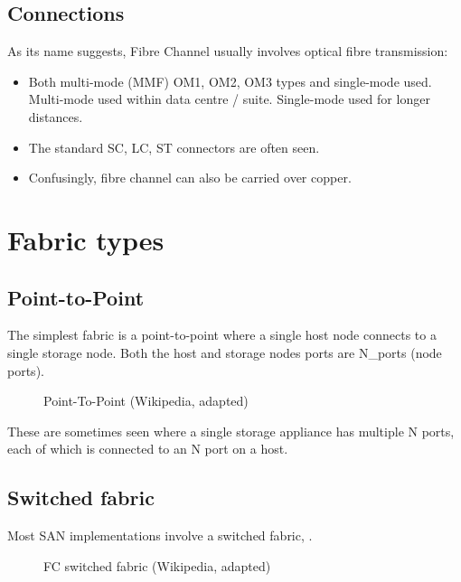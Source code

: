 \subsection{Connections}\label{connections}

As its name suggests, Fibre Channel usually involves optical fibre
transmission:

\begin{itemize}
\item
  Both multi-mode (MMF) OM1, OM2, OM3 types and single-mode used.
  Multi-mode used within data centre / suite. Single-mode used for
  longer distances.
\item
  The standard SC, LC, ST connectors are often seen.
\item
  Confusingly, fibre channel can also be carried over copper.
\end{itemize}

\section{Fabric types}\label{fabric-types}

\subsection{Point-to-Point}\label{point-to-point}

The simplest fabric is a point-to-point where a single host node
connects to a single storage node. Both the host and storage nodes ports
are N\_ports (node ports).

\begin{figure}
\centering
\caption{Point-To-Point (Wikipedia, adapted){}}
\end{figure}

These are sometimes seen where a single storage appliance has multiple N
ports, each of which is connected to an N port on a host.

\subsection{Switched fabric}\label{switched-fabric}

Most SAN implementations involve a switched fabric, .

\begin{figure}
\centering
\caption{FC switched fabric (Wikipedia, adapted){}}
\end{figure}

